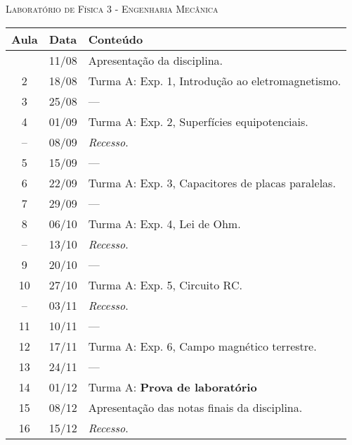 \vspace{1cm}
\begin{center}
\Large\textsc{Laboratório de Física 3 - Engenharia Mecânica}
\end{center}

\begin{center}
\begin{longtable}{ccp{70mm}}
\toprule
Aula & Data & Conteúdo \\
\midrule
\endhead
\bottomrule
\endfoot
1 & 11/08 & Apresentação da disciplina. \\
2 & 18/08 & Turma A: Exp. 1, Introdução ao eletromagnetismo. \\
3 & 25/08 & --- \\ %
4 & 01/09 & Turma A: Exp. 2, Superfícies equipotenciais. \\
-- & 08/09 & \emph{Recesso}. \\
5 & 15/09 & --- \\ %
6 & 22/09 & Turma A: Exp. 3, Capacitores de placas paralelas. \\
7 & 29/09 & --- \\ %
8 & 06/10 & Turma A: Exp. 4, Lei de Ohm. \\
-- & 13/10 & \emph{Recesso}. \\
9 & 20/10 & --- \\ %
10 & 27/10 & Turma A: Exp. 5, Circuito RC. \\
-- & 03/11 & \emph{Recesso}. \\
11 & 10/11 & --- \\ %
12 & 17/11 & Turma A: Exp. 6, Campo magnético terrestre. \\
13 & 24/11 & --- \\ %
14 & 01/12 & Turma A: \textbf{Prova de laboratório} \\ %
15 & 08/12 & Apresentação das notas finais da disciplina. \\
16 & 15/12 & \emph{Recesso}. \\
\end{longtable}
\end{center}

\cleardoublepage
